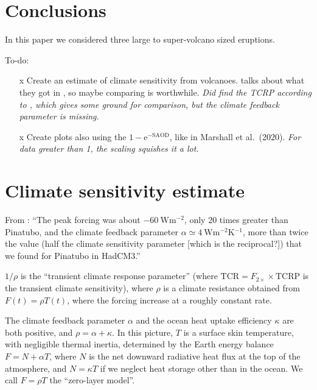 \documentclass{ametsocV5}
\begin{document}
\section{Conclusions}


In this paper we considered three large to super-volcano sized eruptions.

\clearpage

To-do:

\begin{itemize}
  \item[\lbrack{}x\rbrack{}] Create an estimate of climate sensitivity from
    volcanoes. \citet{gregory2016} talks about what they got in \citet{jones2005}, so
    maybe comparing is worthwhile. \emph{Did find the TCRP according to
      \citet{merlis2014}, which gives some ground for comparison, but the climate
      feedback parameter is missing.}
  \item[\lbrack{}x\rbrack{}] Create plots also using the
    \(1-\mathrm{e}^{-\mathrm{SAOD}}\), like in Marshall et al.\ (2020). \emph{For data
      greater than 1, the scaling squishes it a lot.}
\end{itemize}

\section*{Climate sensitivity estimate}

From \citet{gregory2016}: ``The peak forcing was about \(\SI{-60}{\watt\metre^{-2}}\),
only \(20\) times greater than Pinatubo, and the climate feedback parameter \(\alpha
\simeq \SI{4}{\watt\metre^{-2}\kelvin^{-1}}\), more than twice the value (half the
climate sensitivity parameter [which is the reciprocal?]) that we found for Pinatubo in
HadCM3.''

\(1/\rho \) is the ``transient climate response parameter'' (where
\(\mathrm{TCR}=F_{2\times}\times \mathrm{TCRP}\) is the
transient climate sensitivity), where \(\rho \) is
a climate resistance obtained from \(F(t)=\rho T(t)\), where the forcing increase at a
roughly constant rate.

The climate feedback parameter \(\alpha\) and the ocean heat uptake efficiency
\(\kappa\) are both positive, and \(\rho =\alpha +\kappa \). In this picture, \(T\) is a
surface skin temperature, with negligible thermal inertia, determined by the Earth
energy balance \(F=N+\alpha T\), where \(N\) is the net downward radiative heat flux at
the top of the atmosphere, and \(N=\kappa T\) if we neglect heat storage other than in
the ocean. We call \(F=\rho T\) the ``zero-layer model''.
\end{document}
